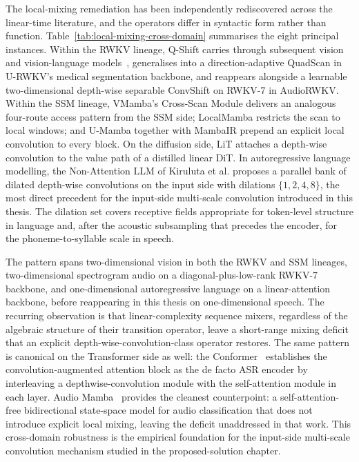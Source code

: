 The local-mixing remediation has been independently rediscovered
across the linear-time literature, and the operators differ in
syntactic form rather than function.
Table~\ref{tab:local-mixing-cross-domain} summarises the eight
principal instances. Within the RWKV lineage, Q-Shift carries
through subsequent vision and vision-language
models~\cite{fei2024diffusionrwkv,hou2024visualrwkv,gu2024rwkvclip},
generalises into a direction-adaptive QuadScan in U-RWKV's
medical segmentation backbone, and reappears alongside a
learnable two-dimensional depth-wise separable ConvShift on
RWKV-7 in AudioRWKV. Within the SSM lineage, VMamba's Cross-Scan
Module delivers an analogous four-route access pattern from the
SSM side; LocalMamba restricts the scan to local windows; and
U-Mamba together with MambaIR prepend an explicit local
convolution to every block. On the diffusion side, LiT attaches
a depth-wise convolution to the value path of a distilled linear
DiT. In autoregressive language modelling, the Non-Attention
LLM of Kiruluta et al. proposes a parallel bank of dilated
depth-wise convolutions on the input side with dilations $\{1, 2,
4, 8\}$, the most direct precedent for the input-side multi-scale
convolution introduced in this thesis. The dilation set covers
receptive fields appropriate for token-level structure in
language and, after the acoustic subsampling that precedes the
encoder, for the phoneme-to-syllable scale in speech.

The pattern spans two-dimensional vision in both the RWKV and SSM
lineages, two-dimensional spectrogram audio on a
diagonal-plus-low-rank RWKV-7 backbone, and one-dimensional
autoregressive language on a linear-attention backbone, before
reappearing in this thesis on one-dimensional speech. The
recurring observation is that linear-complexity sequence mixers,
regardless of the algebraic structure of their transition
operator, leave a short-range mixing deficit that an explicit
depth-wise-convolution-class operator restores. The same pattern
is canonical on the Transformer side as well: the
Conformer~\cite{gulati2020conformer} establishes the
convolution-augmented attention block as the de facto ASR
encoder by interleaving a depthwise-convolution module with the
self-attention module in each layer. Audio
Mamba~\cite{erol2024audiomamba} provides the cleanest
counterpoint: a self-attention-free bidirectional state-space
model for audio classification that does not introduce explicit
local mixing, leaving the deficit unaddressed in that work. This
cross-domain robustness is the empirical foundation for the
input-side multi-scale convolution mechanism studied in the
proposed-solution chapter.

